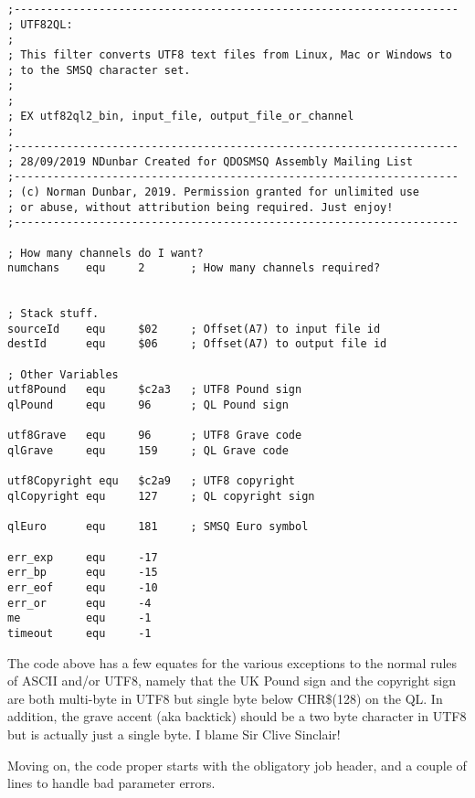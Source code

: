 \begin{lstlisting}[firstnumber=1,caption={Utf82Ql: Introductory comments}]
;--------------------------------------------------------------------
; UTF82QL:
;
; This filter converts UTF8 text files from Linux, Mac or Windows to
; to the SMSQ character set.
;
;
; EX utf82ql2_bin, input_file, output_file_or_channel
;
;--------------------------------------------------------------------
; 28/09/2019 NDunbar Created for QDOSMSQ Assembly Mailing List
;--------------------------------------------------------------------
; (c) Norman Dunbar, 2019. Permission granted for unlimited use
; or abuse, without attribution being required. Just enjoy!
;--------------------------------------------------------------------

; How many channels do I want?
numchans    equ     2       ; How many channels required?


; Stack stuff.
sourceId    equ     $02     ; Offset(A7) to input file id
destId      equ     $06     ; Offset(A7) to output file id

; Other Variables
utf8Pound   equ     $c2a3   ; UTF8 Pound sign
qlPound     equ     96      ; QL Pound sign

utf8Grave   equ     96      ; UTF8 Grave code
qlGrave     equ     159     ; QL Grave code

utf8Copyright equ   $c2a9   ; UTF8 copyright
qlCopyright equ     127     ; QL copyright sign

qlEuro      equ     181     ; SMSQ Euro symbol

err_exp     equ     -17
err_bp      equ     -15
err_eof     equ     -10
err_or      equ     -4
me          equ     -1
timeout     equ     -1
\end{lstlisting}

The code above has a few equates for the various exceptions to the
normal rules of ASCII and/or UTF8, namely that the UK Pound sign and
the copyright sign are both multi-byte in UTF8 but single byte below
CHR\$(128) on the QL. In addition, the grave accent (aka backtick)
should be a two byte character in UTF8 but is actually just a single
byte. I blame Sir Clive Sinclair!

Moving on, the code proper starts with the obligatory job header,
and a couple of lines to handle bad parameter errors.

